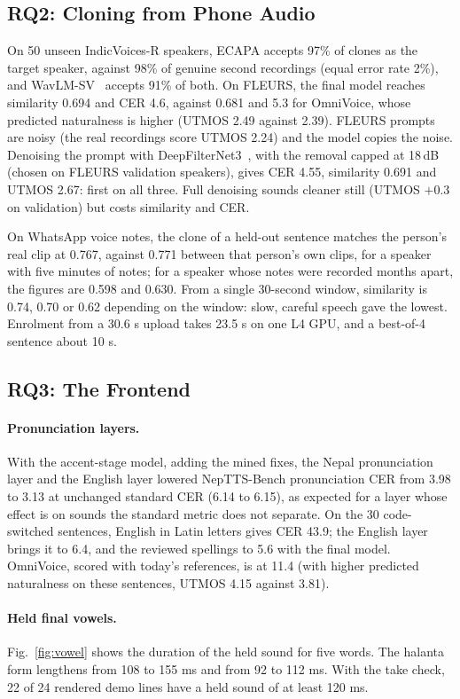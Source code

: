 \subsection{RQ2: Cloning from Phone Audio}
On 50 unseen IndicVoices-R speakers, ECAPA accepts 97\% of clones as the target speaker, against 98\% of genuine second recordings (equal error rate 2\%), and WavLM-SV~\citep{wavlm} accepts 91\% of both. On FLEURS, the final model reaches similarity 0.694 and CER 4.6, against 0.681 and 5.3 for OmniVoice, whose predicted naturalness is higher (UTMOS 2.49 against 2.39). FLEURS prompts are noisy (the real recordings score UTMOS 2.24) and the model copies the noise. Denoising the prompt with DeepFilterNet3~\citep{deepfilternet}, with the removal capped at 18\,dB (chosen on FLEURS validation speakers), gives CER 4.55, similarity 0.691 and UTMOS 2.67: first on all three. Full denoising sounds cleaner still (UTMOS $+0.3$ on validation) but costs similarity and CER.

On WhatsApp voice notes, the clone of a held-out sentence matches the person's real clip at 0.767, against 0.771 between that person's own clips, for a speaker with five minutes of notes; for a speaker whose notes were recorded months apart, the figures are 0.598 and 0.630. From a single 30-second window, similarity is 0.74, 0.70 or 0.62 depending on the window: slow, careful speech gave the lowest. Enrolment from a 30.6 s upload takes 23.5 s on one L4 GPU, and a best-of-4 sentence about 10 s.

\subsection{RQ3: The Frontend}
\paragraph{Pronunciation layers.} With the accent-stage model, adding the mined fixes, the Nepal pronunciation layer and the English layer lowered NepTTS-Bench pronunciation CER from 3.98 to 3.13 at unchanged standard CER (6.14 to 6.15), as expected for a layer whose effect is on sounds the standard metric does not separate. On the 30 code-switched sentences, English in Latin letters gives CER 43.9; the English layer brings it to 6.4, and the reviewed spellings to 5.6 with the final model. OmniVoice, scored with today's references, is at 11.4 (with higher predicted naturalness on these sentences, UTMOS 4.15 against 3.81).

\paragraph{Held final vowels.} Fig.~\ref{fig:vowel} shows the duration of the held sound for five words. The halanta form lengthens  from 108 to 155 ms and  from 92 to 112 ms. With the take check, 22 of 24 rendered demo lines have a held sound of at least 120 ms.

